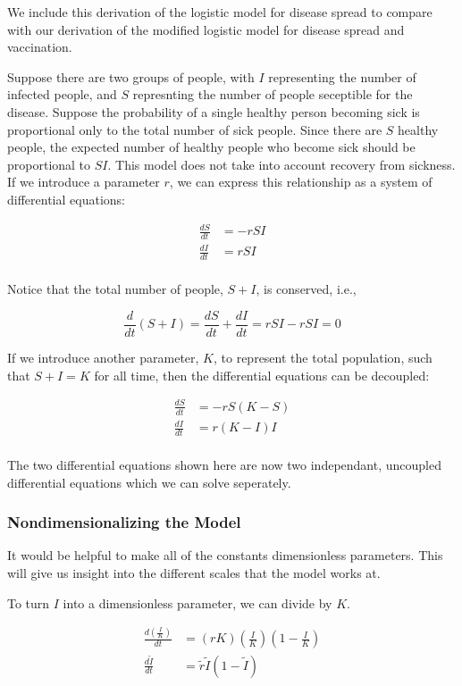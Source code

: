 \documentclass[titlepage]{article}
\begin{document}
We include this derivation of the logistic model for disease spread
	to compare with our derivation of the modified logistic model
	for disease spread and vaccination.

Suppose there are two groups of people, with $I$ representing the number of
	infected people, and $S$ represnting the number of people seceptible for the
	disease.
Suppose the probability of a single healthy person becoming sick is proportional
	only to the total number of sick people.
Since there are $S$ healthy people, the expected number of healthy people
	who become sick should be proportional to $S I$.
This model does not take into account recovery from sickness.
If we introduce a parameter $r$, we can express this relationship as a system
	of differential equations:

\begin{align*}
\frac{dS}{dt} & = - r S I \\
\frac{dI}{dt} & = r S I \\
\end{align*}

Notice that the total number of people, $S + I$, is conserved, i.e.,

\[ \frac{d}{dt} \left( S + I \right) = \frac{dS}{dt} + \frac{dI}{dt}
	= r S I - r S I = 0 \]

If we introduce another parameter, $K$, to represent the total population,
	such that $S + I = K$ for all time, then the differential equations
	can be decoupled:

\begin{align*}
\frac{dS}{dt} & = - r S (K - S) \\
\frac{dI}{dt} & = r (K - I) I \\
\end{align*}

The two differential equations shown here are now two independant, uncoupled
	differential equations which we can solve seperately.

\subsubsection{Nondimensionalizing the Model}

It would be helpful to make all of the constants dimensionless parameters.
This will give us insight into the different scales that the model works at.

To turn $I$ into a dimensionless parameter, we can divide by $K$.

\begin{align*}
\frac{d\left(\frac{I}{K}\right)}{dt}
	& = \left( r K \right) \left( \frac{I}{K} \right) \left( 1 - \frac{I}{K} \right)\\
\frac{d\widetilde{I}}{dt}
	& = \widetilde{r} \widetilde{I} \left( 1 - \widetilde{I} \right)
\end{align*}
\end{document}

